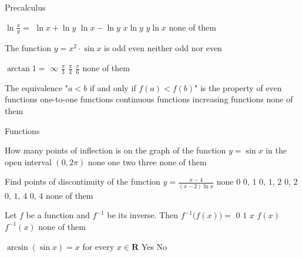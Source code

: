 \documentclass{article}
\begin{document}


\MakeGameBoard

\begin{category}{Precalculus}

\begin{question}
$\ln \frac xy=$
 $\ln x+\ln y$
 $\ln x-\ln y$
 $x\ln y$
 $y\ln x$
 none of them
\end{question}

\begin{question}
The function $y=x^2\cdot \sin x$ is
 odd
 even
 neither odd nor even
\end{question}

\begin{question}
$\arctan 1=$
 $\infty$ 
 $\frac \pi3$
 $\frac \pi4$
 $\frac \pi6$
 none of them
\end{question}

\begin{question}
The equivalence "$a<b$ if and only if $f(a)<f(b)$" is the property of
 even functions
 one-to-one functions
 continuous functions
 increasing functions
 none of them
\end{question}

\end{category}


\begin{category}{Functions}

\begin{question}
How many points of inflection is on the graph of the function $y=\sin x$ in
the open interval $(0,2\pi)$
 none
 one
 two
 three
 none of them
\end{question}

\begin{question}
Find points of discontinuity of the function $y=\frac {x-4}{(x-2)\ln x}$
 none
 $0$
 $0$, $1$
 $0$, $1$, $2$
 $0$, $2$
 $0$, $1$, $4$
 $0$, $4$
 none of them
\end{question}

\begin{question}
Let $f$ be a function and $f^{-1}$ be its inverse. Then $f^{-1}\bigl(f(x)\bigr)=$
 $0$
 $1$
 $x$
 $f(x)$
 $f^{-1}(x)$
 none of them
\end{question}

\begin{question}
$\arcsin(\sin x)=x$ for every $x\in\mathbf{R}$
 Yes
 No
\end{question}

\end{category}
\end{document}
